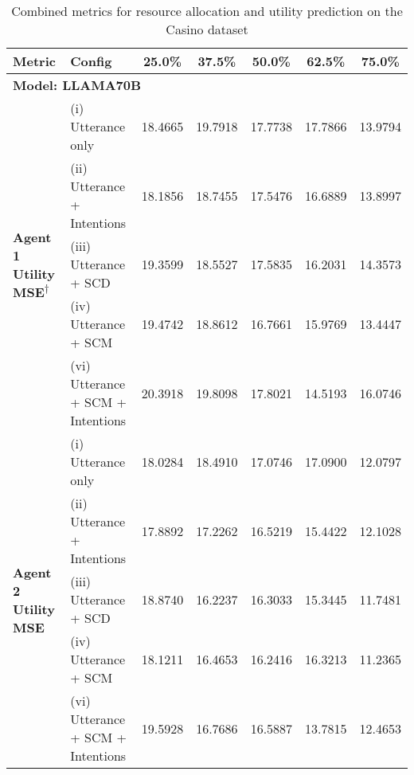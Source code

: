 \begin{table*}[ht]
\centering
\caption{Combined metrics for resource allocation and utility prediction on the Casino dataset}
\label{tab:casino_combined_metrics_by_ratio}
\begin{tabular}{llccccc}
\hline
\textbf{Metric} & \textbf{Config} & \textbf{25.0\%} & \textbf{37.5\%} & \textbf{50.0\%} & \textbf{62.5\%} & \textbf{75.0\%} \\
\hline
\multicolumn{7}{l}{\textbf{Model: LLAMA70B}} \\
\midrule
\multirow{5}{*}{\textbf{Agent 1 Utility MSE\textsuperscript{$\dagger$}}} & (i) Utterance only & 18.4665 & 19.7918 & 17.7738 & 17.7866 & 13.9794 \\
 & (ii) Utterance + Intentions & \cellcolor{green!25}18.1856 & \cellcolor{green!25}18.7455 & \cellcolor{green!25}17.5476 & \cellcolor{green!25}16.6889 & \cellcolor{green!25}13.8997 \\
 & (iii) Utterance + SCD & \cellcolor{red!25}19.3599 & \cellcolor{green!25}18.5527 & \cellcolor{green!25}17.5835 & \cellcolor{green!25}16.2031 & \cellcolor{red!25}14.3573 \\
 & (iv) Utterance + SCM & \cellcolor{red!25}19.4742 & \cellcolor{green!25}18.8612 & \cellcolor{green!25}16.7661 & \cellcolor{green!25}15.9769 & \cellcolor{green!25}13.4447 \\
 & (vi) Utterance + SCM + Intentions & \cellcolor{red!25}20.3918 & \cellcolor{red!25}19.8098 & \cellcolor{red!25}17.8021 & \cellcolor{green!25}14.5193 & \cellcolor{red!25}16.0746 \\
\midrule
\multirow{5}{*}{\textbf{Agent 2 Utility MSE}} & (i) Utterance only & 18.0284 & 18.4910 & 17.0746 & 17.0900 & 12.0797 \\
 & (ii) Utterance + Intentions & \cellcolor{green!25}17.8892 & \cellcolor{green!25}17.2262 & \cellcolor{green!25}16.5219 & \cellcolor{green!25}15.4422 & \cellcolor{red!25}12.1028 \\
 & (iii) Utterance + SCD & \cellcolor{red!25}18.8740 & \cellcolor{green!25}16.2237 & \cellcolor{green!25}16.3033 & \cellcolor{green!25}15.3445 & \cellcolor{green!25}11.7481 \\
 & (iv) Utterance + SCM & \cellcolor{red!25}18.1211 & \cellcolor{green!25}16.4653 & \cellcolor{green!25}16.2416 & \cellcolor{green!25}16.3213 & \cellcolor{green!25}11.2365 \\
 & (vi) Utterance + SCM + Intentions & \cellcolor{red!25}19.5928 & \cellcolor{green!25}16.7686 & \cellcolor{green!25}16.5887 & \cellcolor{green!25}13.7815 & \cellcolor{red!25}12.4653 \\

\end{tabular}
\end{table*}
